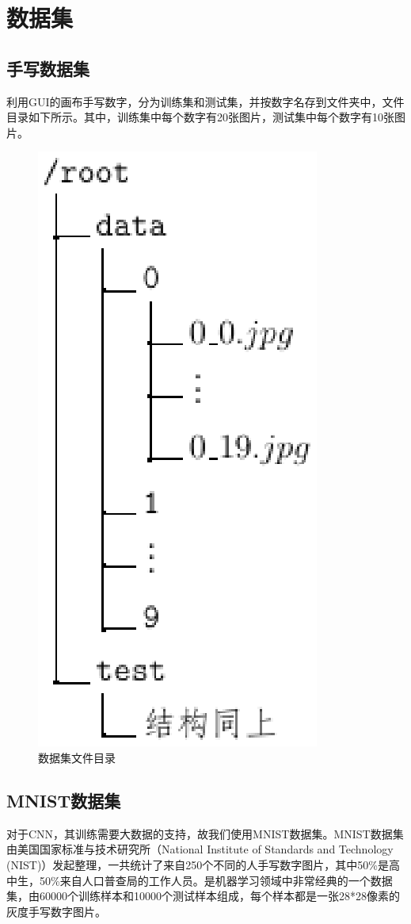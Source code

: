 \documentclass[UTF8, a4paper, 12pt]{report}
\begin{document}
\chapter{数据集}
	\section{手写数据集}
		利用GUI的画布手写数字，分为训练集和测试集，并按数字名存到文件夹中，文件目录如下所示。其中，训练集中每个数字有20张图片，测试集中每个数字有10张图片。
		\begin{figure}[!h]
			\centering
			\includegraphics[scale=0.8]{./img/DataDirTree.eps}
			\caption{数据集文件目录}
			\label{fig:3.1}
		\end{figure}

	\section{MNIST数据集}
		对于CNN，其训练需要大数据的支持，故我们使用MNIST数据集。MNIST数据集由美国国家标准与技术研究所（National Institute of Standards and Technology (NIST)）发起整理，一共统计了来自250个不同的人手写数字图片，其中50\%是高中生，50\%来自人口普查局的工作人员。是机器学习领域中非常经典的一个数据集，由60000个训练样本和10000个测试样本组成，每个样本都是一张28*28像素的灰度手写数字图片。
\end{document}
